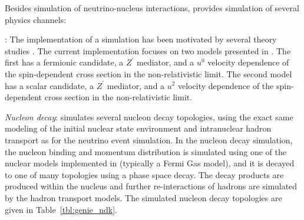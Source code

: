 %
%
%

Besides simulation of neutrino-nucleus interactions,  provides simulation of several  physics channels:

\textit{}: The implementation of a   simulation has been motivated by several theory studies \cite{Agashe:2014yua, Berger:2014sqa, Kong:2014mia, Cherry:2015oca, Kopp:2015bfa, Necib:2016aez, Alhazmi:2016qcs, Kim:2016zjx}. The current implementation focuses on two models presented in  \cite{Berger:2014sqa}. The first has a fermionic  candidate, a $Z^\prime$ mediator, and a $u^0$ velocity dependence of the spin-dependent cross section in the non-relativistic limit. The second model has a scalar  candidate, a $Z^\prime$ mediator, and a $u^2$ velocity dependence of the spin-dependent cross section in the non-relativistic limit.

\textit{Nucleon decay}:  simulates several nucleon decay topologies, using the exact same modeling of
the initial nuclear state environment and intranuclear hadron transport as for the neutrino event simulation. In the nucleon decay simulation, the nucleon binding and momentum distribution is simulated using one of the nuclear models implemented in  (typically a Fermi Gas model), and it is decayed to one of many topologies using a phase space decay. The decay products are produced within the nucleus and further re-interactions of hadrons are simulated by the  hadron transport models. The simulated nucleon decay topologies are given in Table~\ref{tbl:genie_ndk}.

